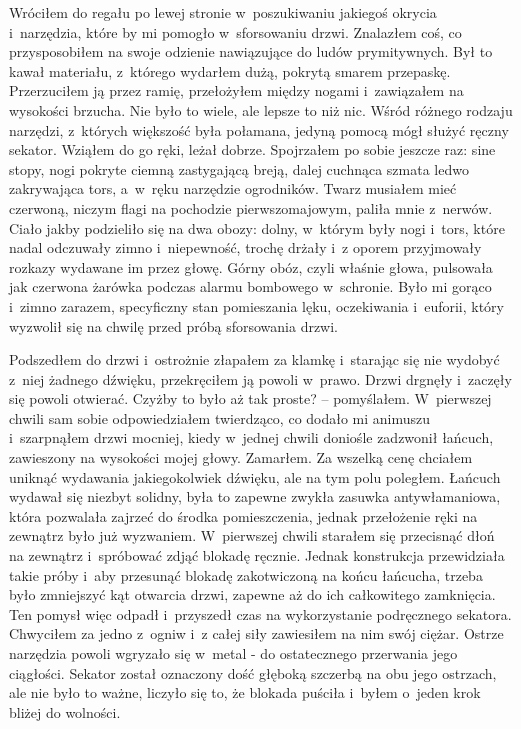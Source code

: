Wróciłem do regału po lewej stronie w~poszukiwaniu jakiegoś okrycia i~narzędzia, które by mi pomogło w~sforsowaniu drzwi. Znalazłem coś, co przysposobiłem na swoje odzienie nawiązujące do ludów prymitywnych. Był to kawał materiału, z~którego wydarłem dużą, pokrytą smarem przepaskę. Przerzuciłem ją przez ramię, przełożyłem między nogami i~zawiązałem na wysokości brzucha. Nie było to wiele, ale lepsze to niż nic. Wśród różnego rodzaju narzędzi, z~których większość była połamana, jedyną pomocą mógł służyć ręczny sekator. Wziąłem do go ręki, leżał dobrze. Spojrzałem po sobie jeszcze raz: sine stopy, nogi pokryte ciemną zastygającą breją, dalej cuchnąca szmata ledwo zakrywająca tors, a~w~ręku narzędzie ogrodników. Twarz musiałem mieć czerwoną, niczym flagi na pochodzie pierwszomajowym, paliła mnie z~nerwów. Ciało jakby podzieliło się na dwa obozy: dolny, w~którym były nogi i~tors, które nadal odczuwały zimno i~niepewność, trochę drżały i~z oporem przyjmowały rozkazy wydawane im przez głowę. Górny obóz, czyli właśnie głowa, pulsowała jak czerwona żarówka podczas alarmu bombowego w~schronie. Było mi gorąco i~zimno zarazem, specyficzny stan pomieszania lęku, oczekiwania i~euforii, który wyzwolił się na chwilę przed próbą sforsowania drzwi.

Podszedłem do drzwi i~ostrożnie złapałem za klamkę i~starając się nie wydobyć z~niej żadnego dźwięku, przekręciłem ją powoli w~prawo. Drzwi drgnęły i~zaczęły się powoli otwierać. Czyżby to było aż tak proste? -- pomyślałem. W~pierwszej chwili sam sobie odpowiedziałem twierdząco, co dodało mi animuszu i~szarpnąłem drzwi mocniej, kiedy w~jednej chwili doniośle zadzwonił łańcuch, zawieszony na wysokości mojej głowy. Zamarłem. Za wszelką cenę chciałem uniknąć wydawania jakiegokolwiek dźwięku, ale na tym polu poległem. Łańcuch wydawał się niezbyt solidny, była to zapewne zwykła zasuwka antywłamaniowa, która pozwalała zajrzeć do środka pomieszczenia, jednak przełożenie ręki na zewnątrz było już wyzwaniem. W~pierwszej chwili starałem się przecisnąć dłoń na zewnątrz i~spróbować zdjąć blokadę ręcznie. Jednak konstrukcja przewidziała takie próby i~aby przesunąć blokadę zakotwiczoną na końcu łańcucha, trzeba było zmniejszyć kąt otwarcia drzwi, zapewne aż do ich całkowitego zamknięcia. Ten pomysł więc odpadł i~przyszedł czas na wykorzystanie podręcznego sekatora. Chwyciłem za jedno z~ogniw i~z całej siły zawiesiłem na nim swój ciężar. Ostrze narzędzia powoli wgryzało się w~metal - do ostatecznego przerwania jego ciągłości. Sekator został oznaczony dość głęboką szczerbą na obu jego ostrzach, ale nie było to ważne, liczyło się to, że blokada puściła i~byłem o~jeden krok bliżej do wolności.

